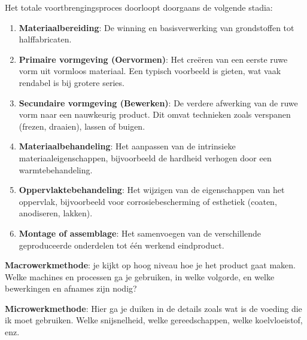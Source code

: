 \documentclass[a4paper,11pt,twoside]{report}
\begin{document}
Het totale voortbrengingsproces doorloopt doorgaans de volgende stadia:
\begin{enumerate}
    \item \textbf{Materiaalbereiding}: De winning en basisverwerking van grondstoffen tot halffabricaten.
    \item \textbf{Primaire vormgeving (Oervormen)}: Het creëren van een eerste ruwe vorm uit vormloos materiaal.
          Een typisch voorbeeld is gieten, wat vaak rendabel is bij grotere series.
    \item \textbf{Secundaire vormgeving (Bewerken)}: De verdere afwerking van de ruwe vorm naar een nauwkeurig product. Dit omvat technieken zoals verspanen (frezen, draaien), lassen of buigen.
    \item \textbf{Materiaalbehandeling}: Het aanpassen van de intrinsieke materiaaleigenschappen, bijvoorbeeld de hardheid verhogen door een warmtebehandeling.
    \item \textbf{Oppervlaktebehandeling}: Het wijzigen van de eigenschappen van het oppervlak, bijvoorbeeld voor corrosiebescherming of esthetiek (coaten, anodiseren, lakken).
    \item \textbf{Montage of assemblage}: Het samenvoegen van de verschillende geproduceerde onderdelen tot één werkend eindproduct.
\end{enumerate}

\textbf{Macrowerkmethode}: je kijkt op hoog niveau hoe je het product gaat maken.
Welke machines en processen ga je gebruiken, in welke volgorde, en welke bewerkingen en afnames zijn nodig?

\textbf{Microwerkmethode}: Hier ga je duiken in de details zoals wat is de voeding die ik moet gebruiken.
Welke snijsnelheid, welke gereedschappen, welke koelvloeistof, enz.
\end{document}
